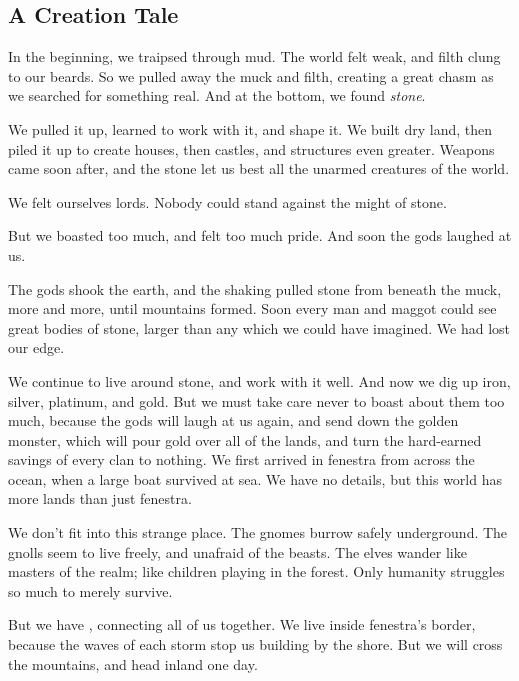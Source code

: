 
\subsection{A Creation Tale}

\begin{exampletext}

\bigbreak
\ifcase\value{r4}\relax\or
  \noindent
  In the beginning, we traipsed through mud.
  The world felt weak, and filth clung to our beards.
  So we pulled away the muck and filth, creating a great chasm as we searched for something real.
  And at the bottom, we found \emph{stone}.

  We pulled it up, learned to work with it, and shape it.
  We built dry land, then piled it up to create houses, then castles, and structures even greater.
  Weapons came soon after, and the stone let us best all the unarmed creatures of the world.

  We felt ourselves lords.
  Nobody could stand against the might of stone.

  But we boasted too much, and felt too much pride.
  And soon the gods laughed at us.

  The gods shook the earth, and the shaking pulled stone from beneath the muck, more and more, until mountains formed.
  Soon every man and maggot could see great bodies of stone, larger than any which we could have imagined.
  We had lost our edge.

  We continue to live around stone, and work with it well.
  And now we dig up iron, silver, platinum, and gold.
  But we must take care never to boast about them too much, because the gods will laugh at us again, and send down the golden monster, which will pour gold over all of the lands, and turn the hard-earned savings of every clan to nothing.
\or
  We first arrived in \gls{fenestra} from across the ocean, when a large boat survived  at sea.
  We have no details, but this world has more lands than just \gls{fenestra}.

  We don't fit into this strange place.
  The gnomes burrow safely underground.
  The gnolls seem to live freely, and unafraid of the beasts.
  The elves wander like masters of the realm; like children playing in the forest.
  Only humanity struggles so much to merely survive.

  But we have , connecting all of us together.
  We live inside \gls{fenestra}'s border, because the waves of each \gls{storm} stop us building by the shore.
  But we will cross the mountains, and head inland one day.


\end{exampletext}
